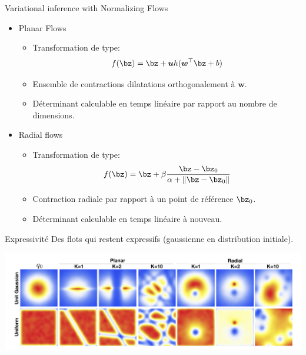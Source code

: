 \documentclass{beamer}
\begin{document}
\begin{frame}{Variational inference with Normalizing Flows}
\begin{itemize}
\item<1-> Planar Flows
\begin{itemize}
\item Transformation de type: 
\begin{equation*}
f( \bz ) = \bz + \boldsymbol{u} h (\boldsymbol{w}^\top \bz +b)
\end{equation*} 
\item Ensemble de contractions dilatations orthogonalement à $\boldsymbol{w}$.
\item Déterminant calculable en temps linéaire par rapport au nombre de dimensions.
\end{itemize}
\item<2-> Radial flows
\begin{itemize}
\item Transformation de type: 
\begin{equation*}
f(\bz) = \bz + \beta \frac{\bz - \bz_0}{\alpha + \left\lVert \bz - \bz_0 \right\rVert}
\end{equation*}
\item Contraction radiale par rapport à un point de référence $\bz_0$. 
\item Déterminant calculable en temps linéaire à nouveau.
\end{itemize}
\end{itemize}
\end{frame}

\begin{frame}{Expressivité}
Des flots qui restent expressifs (gaussienne en distribution initiale). 
\begin{center}
\includegraphics[width=.9\linewidth]{samples/normalizing_flows_expressivity.png}
\end{center}
\end{frame}
\end{document}
